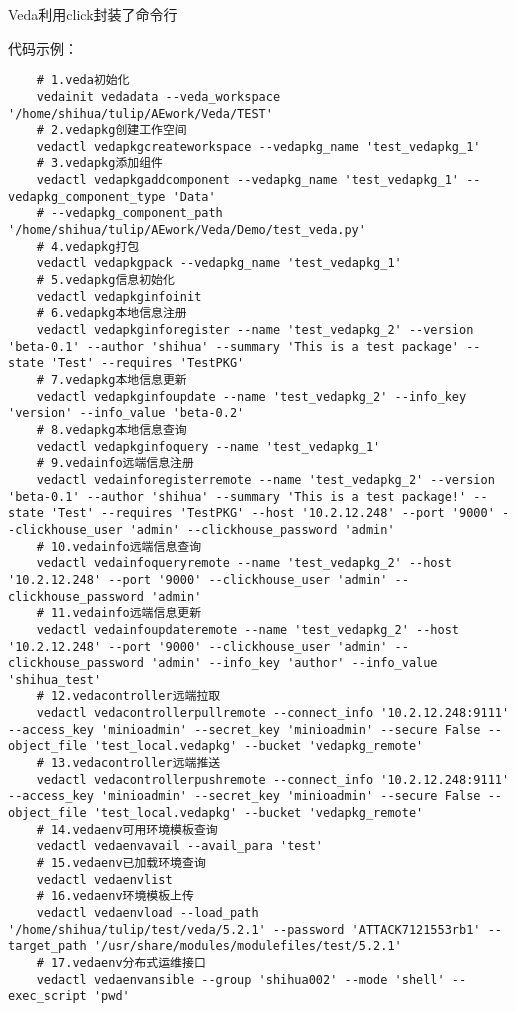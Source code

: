 \documentclass[cn,hazy,blue,14pt,screen]{elegantnote}
\begin{document}
Veda利用click封装了命令行

代码示例：

\begin{lstlisting}
	# 1.veda初始化
	vedainit vedadata --veda_workspace '/home/shihua/tulip/AEwork/Veda/TEST'
	# 2.vedapkg创建工作空间
	vedactl vedapkgcreateworkspace --vedapkg_name 'test_vedapkg_1'
	# 3.vedapkg添加组件
	vedactl vedapkgaddcomponent --vedapkg_name 'test_vedapkg_1' --vedapkg_component_type 'Data' 
	# --vedapkg_component_path '/home/shihua/tulip/AEwork/Veda/Demo/test_veda.py'
	# 4.vedapkg打包
	vedactl vedapkgpack --vedapkg_name 'test_vedapkg_1'
	# 5.vedapkg信息初始化
	vedactl vedapkginfoinit
	# 6.vedapkg本地信息注册
	vedactl vedapkginforegister --name 'test_vedapkg_2' --version 'beta-0.1' --author 'shihua' --summary 'This is a test package' --state 'Test' --requires 'TestPKG'
	# 7.vedapkg本地信息更新
	vedactl vedapkginfoupdate --name 'test_vedapkg_2' --info_key 'version' --info_value 'beta-0.2'
	# 8.vedapkg本地信息查询
	vedactl vedapkginfoquery --name 'test_vedapkg_1'
	# 9.vedainfo远端信息注册
	vedactl vedainforegisterremote --name 'test_vedapkg_2' --version 'beta-0.1' --author 'shihua' --summary 'This is a test package!' --state 'Test' --requires 'TestPKG' --host '10.2.12.248' --port '9000' --clickhouse_user 'admin' --clickhouse_password 'admin'
	# 10.vedainfo远端信息查询
	vedactl vedainfoqueryremote --name 'test_vedapkg_2' --host '10.2.12.248' --port '9000' --clickhouse_user 'admin' --clickhouse_password 'admin'
	# 11.vedainfo远端信息更新
	vedactl vedainfoupdateremote --name 'test_vedapkg_2' --host '10.2.12.248' --port '9000' --clickhouse_user 'admin' --clickhouse_password 'admin' --info_key 'author' --info_value 'shihua_test'
	# 12.vedacontroller远端拉取
	vedactl vedacontrollerpullremote --connect_info '10.2.12.248:9111' --access_key 'minioadmin' --secret_key 'minioadmin' --secure False --object_file 'test_local.vedapkg' --bucket 'vedapkg_remote'
	# 13.vedacontroller远端推送
	vedactl vedacontrollerpushremote --connect_info '10.2.12.248:9111' --access_key 'minioadmin' --secret_key 'minioadmin' --secure False --object_file 'test_local.vedapkg' --bucket 'vedapkg_remote'
	# 14.vedaenv可用环境模板查询
	vedactl vedaenvavail --avail_para 'test'
	# 15.vedaenv已加载环境查询
	vedactl vedaenvlist
	# 16.vedaenv环境模板上传
	vedactl vedaenvload --load_path '/home/shihua/tulip/test/veda/5.2.1' --password 'ATTACK7121553rb1' --target_path '/usr/share/modules/modulefiles/test/5.2.1'
	# 17.vedaenv分布式运维接口
	vedactl vedaenvansible --group 'shihua002' --mode 'shell' --exec_script 'pwd'
\end{lstlisting}
\end{document}
